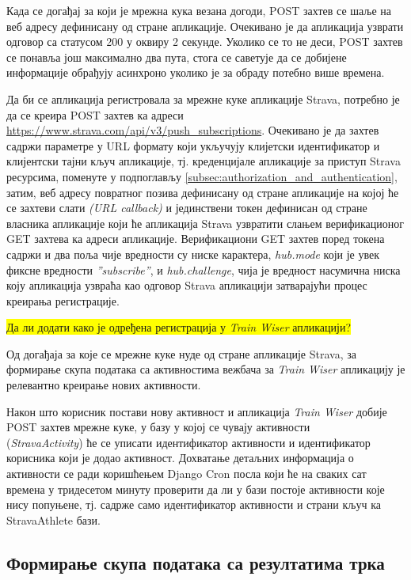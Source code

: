 \documentclass[12pt,oneside]{memoir}
\begin{document}
Када се догађај за који је мрежна кука везана догоди, POST захтев се шаље на веб адресу дефинисану од стране апликације. Очекивано је да апликација узврати одговор са статусом 200 у оквиру 2 секунде. Уколико се то не деси, POST захтев се понавља још максимално два пута, стога се саветује да се добијене информације обрађују асинхроно уколико је за обраду потебно више времена.

Да би се апликација регистровала за мрежне куке апликације Strava,
потребно је да се креира POST захтев ка адреси \url{https://www.strava.com/api/v3/push_subscriptions}. Очекивано је да захтев садржи параметре у URL формату који укључују клијетски идентификатор и клијентски тајни кључ апликације, тј. креденцијале апликације за приступ Strava ресурсима, поменуте у подпоглављу \ref{subsec:authorization_and_authentication}, затим, веб адресу повратног позива дефинисану од стране апликације на којој ће се захтеви слати \textit{(URL callback)} и јединствени токен дефинисан од стране власника апликације који ће апликација Strava узвратити слањем верификационог GET захтева ка адреси апликације. Верификациони GET захтев поред токена садржи и два поља чије вредности су ниске карактера, \textit{hub.mode} који је увек фиксне вредности \textit{''subscribe''}, и \textit{hub.challenge}, чија је вредност насумична ниска коју апликација узвраћа као одговор Strava апликацији затварајући процес креирања регистрације.  %
\cite{strava_webhooks}

\colorbox{yellow}{Да ли додати како је одређена регистрација у \textit{Train Wiser} апликацији?}

Од догађаја за које се мрежне куке нуде од стране апликације Strava, за формирање скупа података са активностима вежбача за \textit{Train Wiser} апликацију је релевантно креирање нових активности.

Након што корисник постави нову активност и апликација \textit{Train Wiser} добије POST захтев мрежне куке, у базу у којој се чувају активности \\(\textit{StravaActivity}) ће се уписати идентификатор активности и идентификатор корисника који је додао активност. Дохватање детаљних информација о активности се ради коришћењем Django Cron посла који ће на сваких сат времена у тридесетом минуту проверити да ли у бази постоје активности које нису попуњене, тј. садрже само идентификатор активности и страни кључ ка StravaAthlete бази. 

\subsection{Формирање скупа података са резултатима трка}
\label{subsec:scrapy_desc}
\end{document}
